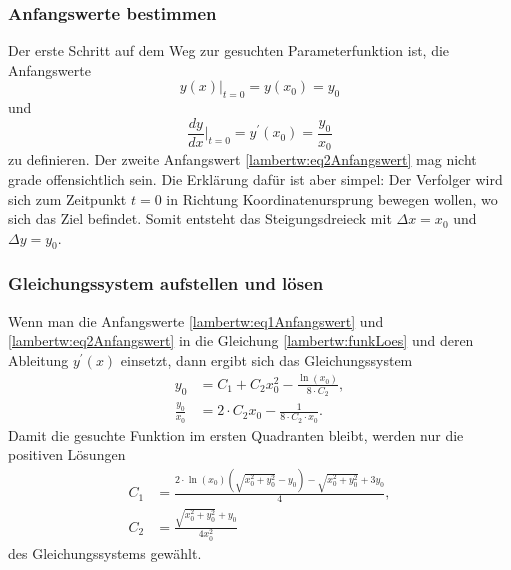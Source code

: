 \subsubsection{Anfangswerte bestimmen
	\label{lambertw:subsubsection:Anfangswerte}}
Der erste Schritt auf dem Weg zur gesuchten Parameterfunktion ist, die Anfangswerte 
\begin{equation}
	y(x)\big \vert_{t=0}
	=
	y(x_0)
	= 
	y_0
	\label{lambertw:eq1Anfangswert}
\end{equation}
und
\begin{equation}
	\frac{dy}{dx}\bigg \vert_{t=0}
	=
	y^{\prime}(x_0)
	=
	\frac{y_0}{x_0}
	\label{lambertw:eq2Anfangswert}
\end{equation}
zu definieren.
Der zweite Anfangswert \eqref{lambertw:eq2Anfangswert} mag nicht grade offensichtlich sein. Die Erklärung dafür ist aber simpel: Der Verfolger wird sich zum Zeitpunkt \(t=0\) in Richtung Koordinatenursprung bewegen wollen, wo sich das Ziel befindet. Somit entsteht das Steigungsdreieck mit \(\Delta x = x_0\) und \(\Delta y = y_0\).

\subsubsection{Gleichungssystem aufstellen und lösen
	\label{lambertw:subsubsection:GlSys}}
Wenn man die Anfangswerte \eqref{lambertw:eq1Anfangswert} und \eqref{lambertw:eq2Anfangswert} in die Gleichung \eqref{lambertw:funkLoes} und deren Ableitung \(y^{\prime}(x)\) einsetzt, dann ergibt sich das Gleichungssystem
\begin{subequations}
	\label{lambertw:eqGleichungssystem}
	\begin{align}
		y_0
		&=
		C_1 + C_2 x^2_0 - \frac{\operatorname{ln}(x_0)}{8 \cdot C_2}, \\
		\frac{y_0}{x_0}
		&=
		2 \cdot  C_2 x_0 - \frac{1}{8 \cdot C_2 \cdot x_0}.
	\end{align}
\end{subequations}
Damit die gesuchte Funktion im ersten Quadranten bleibt, werden nur die positiven Lösungen  
\begin{subequations}
	\begin{align}
		\label{lambertw:eqKoeff1}
		C_1
		&=
		\frac{2\cdot\operatorname{ln}(x_0)\left(\sqrt{x_0^2 + y_0^2} - y_0 \right) - \sqrt{x_0^2 + y_0^2} + 3 y_0}{4}, \\
		\label{lambertw:eqKoeff2}
		C_2
		&=
		\frac{\sqrt{x_0^2 + y_0^2} + y_0}{4x_0^2}
	\end{align}
\end{subequations}
des Gleichungssystems gewählt.
